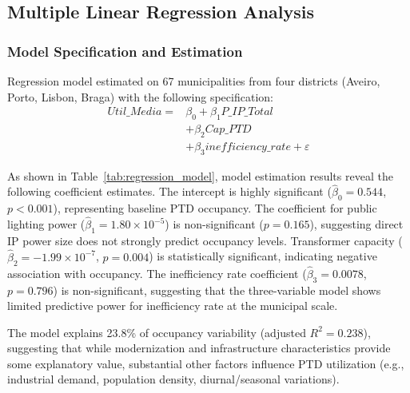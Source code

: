 \documentclass[conference]{IEEEtran}
\begin{document}
\subsection{Multiple Linear Regression Analysis}

\subsubsection{Model Specification and Estimation}
Regression model estimated on 67 municipalities from four districts (Aveiro, Porto, Lisbon, Braga) with the following specification:
\begin{equation}
\begin{aligned}
Util\_Media ={}& \beta_0 + \beta_1 P\_IP\_Total \\
& + \beta_2 Cap\_PTD \\
& + \beta_3 inefficiency\_rate + \varepsilon
\end{aligned}
\end{equation}

As shown in Table~\ref{tab:regression_model}, model estimation results reveal the following coefficient estimates. The intercept is highly significant ($\hat{\beta}_0 = 0.544$, $p < 0.001$), representing baseline PTD occupancy. The coefficient for public lighting power ($\hat{\beta}_1 = 1.80 \times 10^{-5}$) is non-significant ($p = 0.165$), suggesting direct IP power size does not strongly predict occupancy levels. Transformer capacity ($\hat{\beta}_2 = -1.99 \times 10^{-7}$, $p = 0.004$) is statistically significant, indicating negative association with occupancy. The inefficiency rate coefficient ($\hat{\beta}_3 = 0.0078$, $p = 0.796$) is non-significant, suggesting that the three-variable model shows limited predictive power for inefficiency rate at the municipal scale.

The model explains 23.8\% of occupancy variability (adjusted $R^2 = 0.238$), suggesting that while modernization and infrastructure characteristics provide some explanatory value, substantial other factors influence PTD utilization (e.g., industrial demand, population density, diurnal/seasonal variations).
\end{document}
